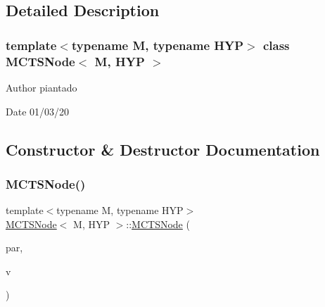 \subsection{Detailed Description}
\subsubsection*{template$<$typename M, typename H\+YP$>$\newline
class M\+C\+T\+S\+Node$<$ M, H\+Y\+P $>$}

\begin{DoxyAuthor}{Author}
piantado 
\end{DoxyAuthor}
\begin{DoxyDate}{Date}
01/03/20 
\end{DoxyDate}


\subsection{Constructor \& Destructor Documentation}
\mbox{\label{class_m_c_t_s_node_a94e679ddbb9f4eeaaa45b6214889f47c}} 
\subsubsection{\texorpdfstring{M\+C\+T\+S\+Node()}{MCTSNode()}\hspace{0.1cm}{\footnotesize\ttfamily [1/4]}}
{\footnotesize\ttfamily template$<$typename M, typename H\+YP$>$ \\
\hyperlink{class_m_c_t_s_node}{M\+C\+T\+S\+Node}$<$ M, H\+YP $>$\+::\hyperlink{class_m_c_t_s_node}{M\+C\+T\+S\+Node} (\begin{DoxyParamCaption}\item[{M $\ast$}]{par,  }\item[{H\+YP \&}]{v }\end{DoxyParamCaption})\hspace{0.3cm}{\ttfamily [inline]}}

\mbox{\label{class_m_c_t_s_node_a944daa7d3d710b6e8000dc8dc076c674}} 
